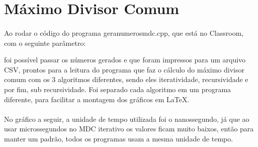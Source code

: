 \documentclass{article}
\begin{document}
\section{Máximo Divisor Comum}
\paragraph{} Ao rodar o código do programa gera\textunderscore numeros\textunderscore mdc.cpp, que está no Classroom, com o seguinte parâmetro:

foi possível passar os números gerados e que foram impressos para um arquivo CSV, prontos para a leitura do programa que faz o cálculo do máximo divisor comum com os 3 algoritmos diferentes, sendo eles iteratividade, recursividade e por fim, sub recursividade. Foi separado cada algoritmo em um programa diferente, para facilitar a montagem dos gráficos em \LaTeX. 
\paragraph{} No gráfico a seguir, a unidade de tempo utilizada foi o nanossegundo, já que ao usar microssegundos no MDC iterativo os valores ficam muito baixos, então para manter um padrão, todos os programas usam a mesma unidade de tempo. 
\end{document}
